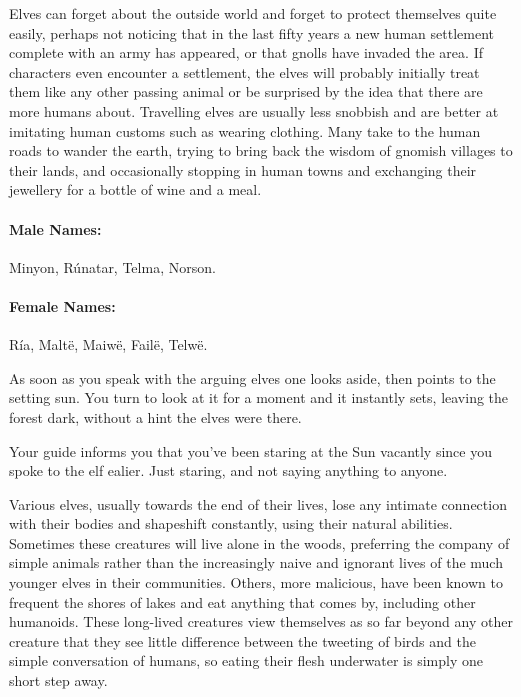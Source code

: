 \begin{multicols}{2}
\begin{boxtext}
\end{boxtext}

Elves can forget about the outside world and forget to protect themselves quite easily, perhaps not noticing that in the last fifty years a new human settlement complete with an army has appeared, or that gnolls have invaded the area.
If characters even encounter a settlement, the elves will probably initially treat them like any other passing animal or be surprised by the idea that there are more humans about.
Travelling elves are usually less snobbish and are better at imitating human customs such as wearing clothing.
Many take to the human roads to wander the earth, trying to bring back the wisdom of gnomish villages to their lands, and occasionally stopping in human towns and exchanging their jewellery for a bottle of wine and a meal.

\paragraph{Male Names:} Minyon, R\'{u}natar, Telma, Norson.
\paragraph{Female Names:} R\'{i}a, Malt\"{e}, Maiw\"{e}, Fail\"{e}, Telw\"{e}.

\begin{boxtext}

	As soon as you speak with the arguing elves one looks aside, then points to the setting sun.
	You turn to look at it for a moment and it instantly sets, leaving the forest dark, without a hint the elves were there.

	Your guide informs you that you've been staring at the Sun vacantly since you spoke to the elf ealier.
	Just staring, and not saying anything to anyone.

\end{boxtext}

\label{dryad}

Various elves, usually towards the end of their lives, lose any intimate connection with their bodies and shapeshift constantly, using their natural abilities.  Sometimes these creatures will live alone in the woods, preferring the company of simple animals rather than the increasingly naive and ignorant lives of the much younger elves in their communities.  Others, more malicious, have been known to frequent the shores of lakes and eat anything that comes by, including other humanoids.  These long-lived creatures view themselves as so far beyond any other creature that they see little difference between the tweeting of birds and the simple conversation of humans, so eating their flesh underwater is simply one short step away.


\end{multicols}
